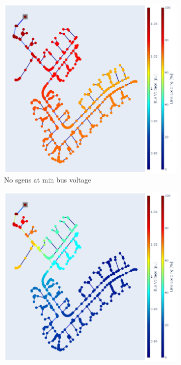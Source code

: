 \documentclass[a4paper,10pt]{report}
\begin{document}
\FloatBarrier
\begin{figure}
	\centering
	\begin{subfigure}[b]{0.475\textwidth}
		\centering
		\includegraphics[width=\textwidth]{hosting_cap_min_empty}
		\caption[]
		{{\small No sgens at min bus voltage}}    
		\label{hopsting_cap_figures_a}
	\end{subfigure}
	\hfill
	\begin{subfigure}[b]{0.475\textwidth}  
		\centering 
		\includegraphics[width=\textwidth]{hosting_cap_min_full}

\end{subfigure}
\end{figure}
\end{document}
